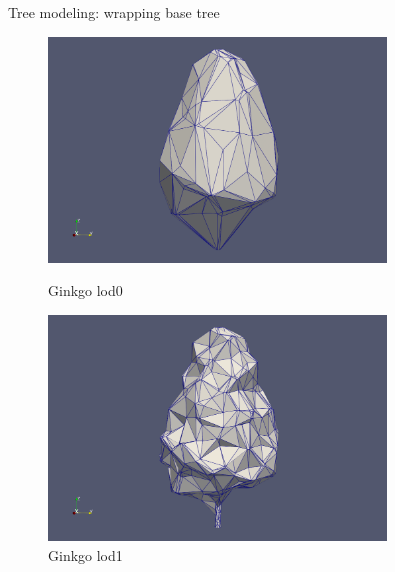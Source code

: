 \documentclass[10pt]{beamer}
\begin{document}
\begin{frame}{Tree modeling: wrapping base tree}
  \begin{figure}[H]
    \centering
    \begin{minipage}{0.49\textwidth}
        \centering
        \includegraphics[width=0.8\textwidth]{images/gingko_lod0.png}
        \caption{Ginkgo lod0}
    \end{minipage}\hfill
    \begin{minipage}{0.49\textwidth}
        \centering
        \includegraphics[width=0.8\textwidth]{images/gingko_lod1.png}
        \caption{Ginkgo lod1}
    \end{minipage}
\end{figure}


\end{frame}
\end{document}
